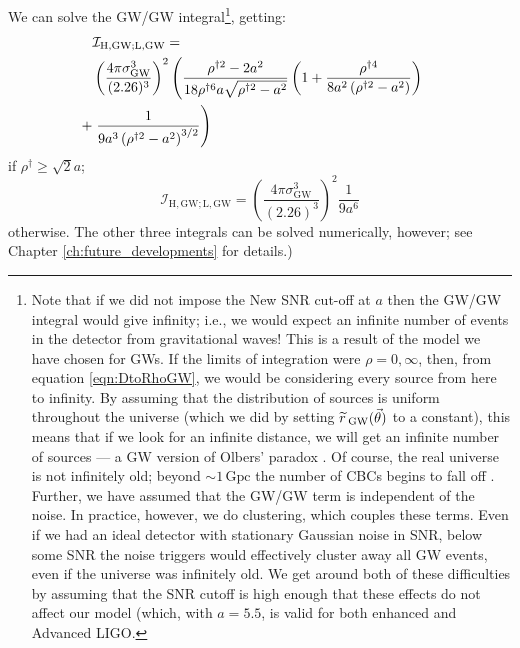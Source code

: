 We can solve the GW/GW integral\footnote{Note that if we did not impose the New \ac{SNR} cut-off at $a$ then the GW/GW integral would give infinity; i.e., we would expect an infinite number of events in the detector from gravitational waves! This is a result of the model we have chosen for \acp{GW}. If the limits of integration were $\rho = 0,\infty$, then, from equation \ref{eqn:DtoRhoGW}, we would be considering every source from here to infinity. By assuming that the distribution of sources is uniform throughout the universe (which we did by setting $\widetilde{r}\,_{\mathrm{GW}}(\vec{\theta})$ to a constant), this means that if we look for an infinite distance, we will get an infinite number of sources --- a \ac{GW} version of Olbers' paradox \cite{Harrison:1987}. Of course, the real universe is not infinitely old; beyond $\sim 1\,\mathrm{Gpc}$ the number of \acp{CBC} begins to fall off \cite{ratesdoc}. Further, we have assumed that the GW/GW term is independent of the noise. In practice, however, we do clustering, which couples these terms. Even if we had an ideal detector with stationary Gaussian noise in \ac{SNR}, below some \ac{SNR} the noise triggers would effectively cluster away all \ac{GW} events, even if the universe was infinitely old. We get around both of these difficulties by assuming that the \ac{SNR} cutoff is high enough that these effects do not affect our model (which, with $a=5.5$, is valid for both enhanced and Advanced \ac{LIGO}.}, getting:
\begin{align}
\lefteqn{ \mathcal{I}_{\mathrm{H,GW;L,GW}} = } \nonumber \\
 & \left( \frac{4\pi \sigma_{\mathrm{GW}}^3}{(2.26)^3} \right)^2 \left( \frac{\rho^{\dagger2} - 2a^2}{18 \rho^{\dagger6} a \sqrt{\rho^{\dagger2} - a^2}} \left( 1 + \frac{\rho^{\dagger4}}{8a^2\left(\rho^{\dagger2} - a^2 \right)} \right) \right. \nonumber \\
 +& \left. \frac{1}{9a^3 \left(\rho^{\dagger2} - a^2 \right)^{3/2}} \right)
\end{align}
if $\rho^\dagger \geq \sqrt{2}a$;
\begin{equation}
\mathcal{I}_{\mathrm{H,GW;L,GW}} = \left( \frac{4\pi \sigma_{\mathrm{GW}}^3}{(2.26)^3} \right)^2 \frac{1}{9a^6}
\end{equation}
otherwise. The other three integrals can be solved numerically, however; see Chapter \ref{ch:future_developments} for details.)

